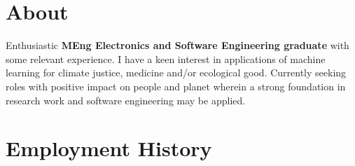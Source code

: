\documentclass[]{cv-style}     %
\begin{document}
\section{About}
  \vspace{-0.4cm}

Enthusiastic \textbf{MEng Electronics and Software Engineering graduate} with some relevant experience. I have a keen interest in applications of machine learning for climate justice, medicine and/or ecological good. Currently seeking roles with positive impact on people and planet wherein a strong foundation in research work and software engineering may be applied.
  \vspace{-0.2cm}
\section{Employment History}
  \vspace{-0.4cm}
  
\end{document}
